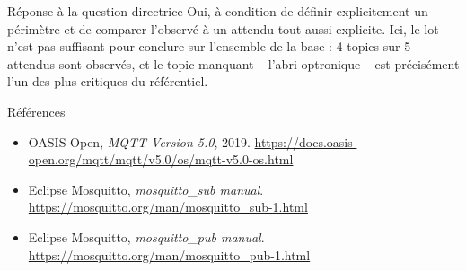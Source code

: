 \documentclass[aspectratio=169]{beamer}
\begin{document}
\begin{frame}{Réponse à la question directrice}
Oui, à condition de définir explicitement un périmètre et de comparer l'observé à un attendu tout aussi explicite. Ici, le lot n'est pas suffisant pour conclure sur l'ensemble de la base : 4 topics sur 5 attendus sont observés, et le topic manquant -- l'abri optronique -- est précisément l'un des plus critiques du référentiel.
\end{frame}

\begin{frame}{Références}
\small
\begin{itemize}
\item OASIS Open, \emph{MQTT Version 5.0}, 2019. \url{https://docs.oasis-open.org/mqtt/mqtt/v5.0/os/mqtt-v5.0-os.html}
\item Eclipse Mosquitto, \emph{mosquitto\_sub manual}. \url{https://mosquitto.org/man/mosquitto_sub-1.html}
\item Eclipse Mosquitto, \emph{mosquitto\_pub manual}. \url{https://mosquitto.org/man/mosquitto_pub-1.html}
\end{itemize}
\end{frame}
\end{document}
